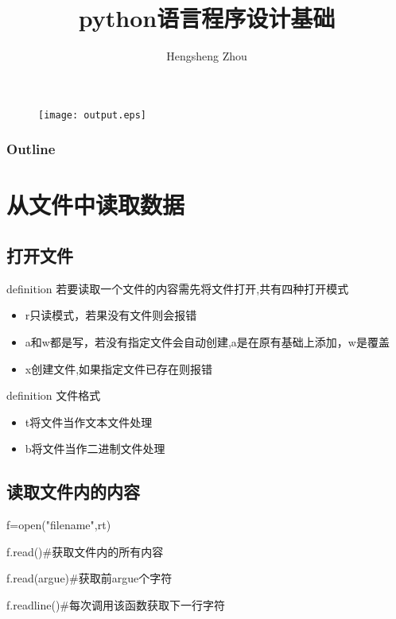 \documentclass{beamer}
\title{python语言程序设计基础}
\author{Hengsheng Zhou}
\institute{电信与智能制造学院}
\begin{document}
\begin{frame}[t]
	\titlepage
	\begin{figure}
		\begin{center}
			\texttt{[image: output.eps]}
		\end{center}
	\end{figure}


\end{frame}
\begin{frame}
	\frametitle{Outline}
	\tableofcontents
\end{frame}

\section{从文件中读取数据}

\subsection{打开文件}

\begin{frame}[t]
	\begin{block}{definition}
		若要读取一个文件的内容需先将文件打开,共有四种打开模式
		\begin{itemize}
			\item r只读模式，若果没有文件则会报错
			      \pause

			\item a和w都是写，若没有指定文件会自动创建,a是在原有基础上添加，w是覆盖
			      \pause

			\item x创建文件,如果指定文件已存在则报错

		\end{itemize}

	\end{block}
	\pause
	\begin{block}{definition}
		文件格式
		\begin{itemize}
			\item t将文件当作文本文件处理
			      \pause

			\item b将文件当作二进制文件处理

		\end{itemize}

	\end{block}
\end{frame}
\subsection{读取文件内的内容}
\begin{frame}[t]
	f=open("filename",rt)\\
	\begin{example}[]
		f.read()\#获取文件内的所有内容
	\end{example}
	\pause
	\begin{example}[]
		f.read(argue)\#获取前argue个字符
	\end{example}
	\pause
	\begin{example}[]
		f.readline()\#每次调用该函数获取下一行字符
	\end{example}

\end{frame}
\end{document}
